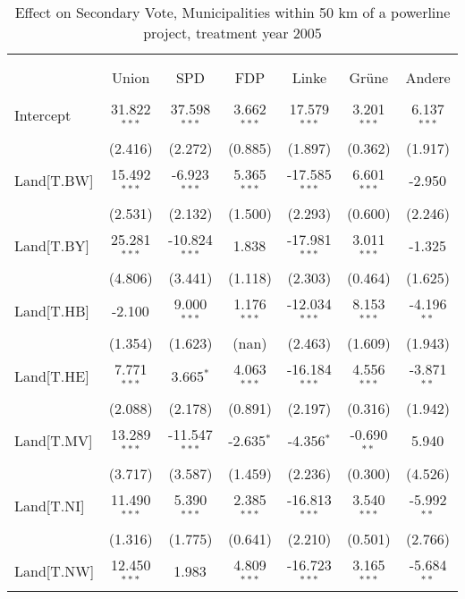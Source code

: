\begin{table}[!htbp] \centering
  \caption{Effect on Secondary Vote, Municipalities within 50 km of a powerline project, treatment year 2005}
\begin{tabular}{@{\extracolsep{5pt}}lcccccc}
\\[-1.8ex]\hline
\hline \\[-1.8ex]
\\[-1.8ex] & \multicolumn{1}{c}{Union} & \multicolumn{1}{c}{SPD} & \multicolumn{1}{c}{FDP} & \multicolumn{1}{c}{Linke} & \multicolumn{1}{c}{Grüne} & \multicolumn{1}{c}{Andere}  \\
\hline \\[-1.8ex]
 Intercept & 31.822$^{***}$ & 37.598$^{***}$ & 3.662$^{***}$ & 17.579$^{***}$ & 3.201$^{***}$ & 6.137$^{***}$ \\
  & (2.416) & (2.272) & (0.885) & (1.897) & (0.362) & (1.917) \\
 Land[T.BW] & 15.492$^{***}$ & -6.923$^{***}$ & 5.365$^{***}$ & -17.585$^{***}$ & 6.601$^{***}$ & -2.950$^{}$ \\
  & (2.531) & (2.132) & (1.500) & (2.293) & (0.600) & (2.246) \\
 Land[T.BY] & 25.281$^{***}$ & -10.824$^{***}$ & 1.838$^{}$ & -17.981$^{***}$ & 3.011$^{***}$ & -1.325$^{}$ \\
  & (4.806) & (3.441) & (1.118) & (2.303) & (0.464) & (1.625) \\
 Land[T.HB] & -2.100$^{}$ & 9.000$^{***}$ & 1.176$^{***}$ & -12.034$^{***}$ & 8.153$^{***}$ & -4.196$^{**}$ \\
  & (1.354) & (1.623) & (nan) & (2.463) & (1.609) & (1.943) \\
 Land[T.HE] & 7.771$^{***}$ & 3.665$^{*}$ & 4.063$^{***}$ & -16.184$^{***}$ & 4.556$^{***}$ & -3.871$^{**}$ \\
  & (2.088) & (2.178) & (0.891) & (2.197) & (0.316) & (1.942) \\
 Land[T.MV] & 13.289$^{***}$ & -11.547$^{***}$ & -2.635$^{*}$ & -4.356$^{*}$ & -0.690$^{**}$ & 5.940$^{}$ \\
  & (3.717) & (3.587) & (1.459) & (2.236) & (0.300) & (4.526) \\
 Land[T.NI] & 11.490$^{***}$ & 5.390$^{***}$ & 2.385$^{***}$ & -16.813$^{***}$ & 3.540$^{***}$ & -5.992$^{**}$ \\
  & (1.316) & (1.775) & (0.641) & (2.210) & (0.501) & (2.766) \\
 Land[T.NW] & 12.450$^{***}$ & 1.983$^{}$ & 4.809$^{***}$ & -16.723$^{***}$ & 3.165$^{***}$ & -5.684$^{**}$ \\

\end{tabular}
\end{table}
